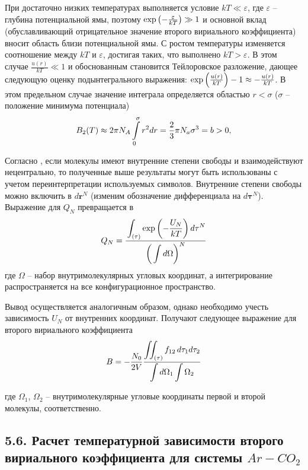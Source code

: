При достаточно низких температурах выполняется условие $k T \ll \varepsilon$, где $\varepsilon$ -- глубина потенциальной ямы, поэтому $\exp \left( - \frac{\varepsilon}{k T} \right) \gg 1$ и основной вклад (обуславливающий отрицательное значение второго вириального коэффициента) вносит область близи потенциальной ямы. С ростом температуры изменяется соотношение между $k T$ и $\varepsilon$, достигая таких, что выполнено $k T > \varepsilon$. В этом случае $\frac{u(r)}{k T} \ll 1$ и обоснованным становится Тейлоровское разложение, дающее следующую оценку подынтегрального выражения: $\exp \left( \frac{u(r)}{kT} \right) - 1 \approx - \frac{u(r)}{kT}$. В этом предельном случае значение интеграла определяется областью $r < \sigma$ ($\sigma$ -- положение минимума потенциала) 
\vverh
\begin{gather}
	B_2(T) \approx 2 \pi N_A \int\limits_0^\sigma r^2 dr = \frac{2}{3} \pi N_a \sigma^3 = b > 0, \notag
\end{gather}

Согласно \cite{meyson}, если молекулы имеют внутренние степени свободы и взаимодействуют нецентрально, то полученные выше результаты могут быть использованы с учетом переинтерпретации используемых символов. Внутренние степени свободы можно включить в $d \mathbf{r}^N$ (изменим обозначение дифференциала на $d \mathbf{\tau}^N$). Выражение для $Q_N$ превращается в 
\vverh
\begin{gather}
	Q_N = \frac{\displaystyle \strut\int_{\left( \tau \right)} \exp \left( - \frac{U_N}{k T}\right) d \mathbf{\tau}^N}{\displaystyle \left( \strut\int d \Omega \right)^N} \notag
\end{gather}
где $\Omega$ -- набор внутримолекулярных угловых координат, а интегрирование распространяется на все конфигурационное пространство.

Вывод осуществляется аналогичным образом, однако необходимо учесть зависимость $U_N$ от внутренних координат. Получают следующее выражение для второго вириального коэффициента \cite{mayer}
\vverh
\begin{gather}
	B = - \frac{N_0}{2 V} \frac{\displaystyle \iint_{\left( \tau \right)} f_{12} \, d \tau_1 d \tau_2}{\displaystyle  \int d \Omega_1 \int \Omega_2} \label{vircoef}
\end{gather}

где $\Omega_1$, $\Omega_2$ -- внутримолекулярные угловые координаты первой и второй молекулы, соответственно.

\subsection*{\textbf{5.6.} Расчет температурной зависимости второго вириального коэффициента для системы $Ar-CO_2$}

